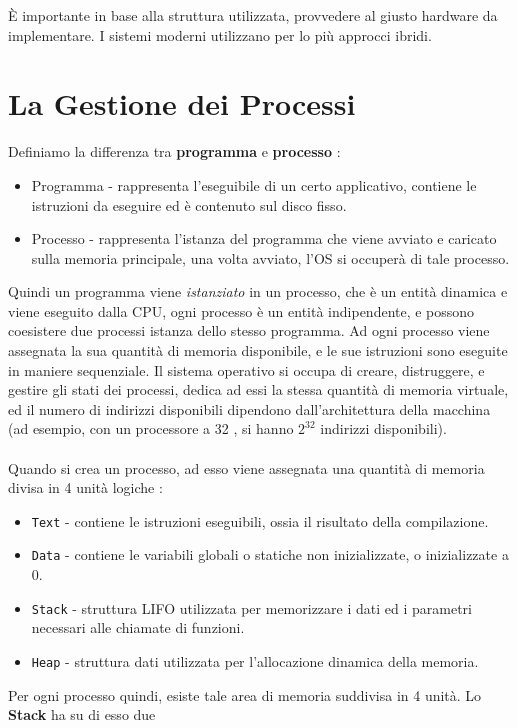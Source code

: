 \documentclass[12pt, letterpaper]{article}
\newcommand{\code}[1]{\colorbox{light-gray}{\texttt{#1}}}
\begin{document}
È importante in base alla struttura utilizzata, provvedere al giusto hardware da implementare. I sistemi 
moderni utilizzano per lo più approcci ibridi.\newpage
\section{La Gestione dei Processi}
Definiamo la differenza tra \textbf{programma} e \textbf{processo} :
\begin{itemize}
    \item Programma - rappresenta l'eseguibile di un certo applicativo, contiene le istruzioni da eseguire ed 
     è contenuto sul disco fisso. 
     \item Processo - rappresenta l'istanza del programma che viene avviato e caricato sulla memoria principale,
     una volta avviato, l'OS si occuperà di tale processo. 
\end{itemize}
Quindi un programma viene \textit{istanziato} in un processo, che è un entità dinamica e viene eseguito 
dalla CPU, ogni processo è un entità indipendente, e possono coesistere due processi istanza dello stesso
programma. Ad ogni processo viene assegnata la sua quantità di memoria disponibile, e le sue istruzioni sono 
eseguite in maniere sequenziale. Il sistema operativo si occupa di creare, distruggere, e gestire gli stati 
dei processi, dedica ad essi la stessa quantità di memoria virtuale, ed il numero di indirizzi disponibili dipendono 
dall'architettura della macchina (ad esempio, con un processore a 32 , si hanno \(2^{32}\) indirizzi disponibili).
\\\hphantom{.}\\
Quando si crea un processo, ad esso viene assegnata una quantità di memoria divisa in 4 unità logiche :
\begin{itemize}
    \item \code{Text} - contiene le istruzioni eseguibili, ossia il risultato della compilazione.
    \item \code{Data} - contiene le variabili globali o statiche non inizializzate, o inizializzate a 0.
    \item \code{Stack} - struttura LIFO utilizzata per memorizzare i dati ed i parametri necessari alle chiamate di funzioni.
    \item \code{Heap} - struttura dati utilizzata per l'allocazione dinamica della memoria.
\end{itemize}
Per ogni processo quindi, esiste tale area di memoria suddivisa in 4 unità. Lo \textbf{Stack} ha su di esso due 
\end{document}
